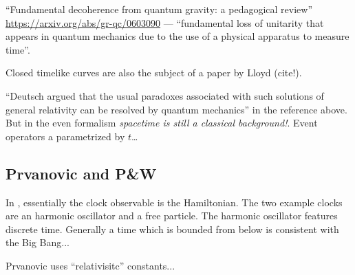 ``Fundamental decoherence from quantum gravity: a pedagogical review''
\url{https://arxiv.org/abs/gr-qc/0603090} ---
``fundamental loss of unitarity
that appears in quantum mechanics
due to the use of a physical apparatus to measure time''.

Closed timelike curves are also the subject of a paper by Lloyd (cite!).

``Deutsch argued that
the usual paradoxes associated with such solutions of general
relativity can be resolved by quantum mechanics''  in the reference above. But in the even formalism
\emph{spacetime is still a classical background!}. Event operators a parametrized by $t$\dots

\subsection{Prvanovic and P\&W}
In \cite{Prvanovic}, essentially the clock observable is the Hamiltonian.
The two example clocks are an harmonic oscillator and a free particle.
The harmonic oscillator features discrete time. Generally a time which is
{bounded from below}
is consistent with the Big Bang...

Prvanovic uses ``relativisitc'' constants...



